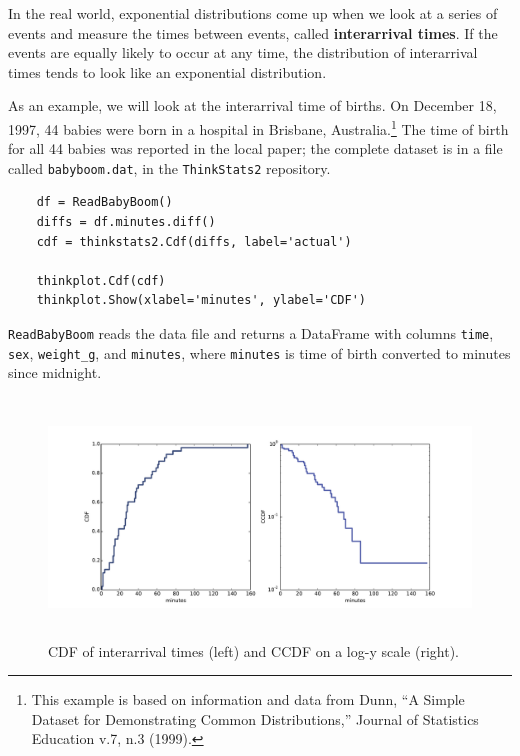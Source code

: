 \documentclass[12pt]{book}
\begin{document}
In the real world, exponential distributions
come up when we look at a series of events and measure the
times between events, called {\bf interarrival times}.
If the events are equally likely to occur at any time, the distribution
of interarrival times tends to look like an exponential distribution.

As an example, we will look at the interarrival time of births.
On December 18, 1997, 44 babies were born in a hospital in Brisbane,
Australia.\footnote{This example is based on information and data from
  Dunn, ``A Simple Dataset for Demonstrating Common Distributions,''
  Journal of Statistics Education v.7, n.3 (1999).}  The time of
birth for all 44 babies was reported in the local paper; the
complete dataset is in a file called {\tt babyboom.dat}, in the
{\tt ThinkStats2} repository.
 

\begin{verbatim}
    df = ReadBabyBoom()
    diffs = df.minutes.diff()
    cdf = thinkstats2.Cdf(diffs, label='actual')

    thinkplot.Cdf(cdf)
    thinkplot.Show(xlabel='minutes', ylabel='CDF')
\end{verbatim}

{\tt ReadBabyBoom} reads the data file and returns a DataFrame
with columns {\tt time}, {\tt sex}, \verb"weight_g", and {\tt minutes},
where {\tt minutes} is time of birth converted to minutes since
midnight.

\begin{figure}
\centerline{\includegraphics[height=2.5in]{figs/analytic_interarrivals.pdf}}
\caption{CDF of interarrival times (left) and CCDF on a log-y scale (right).}
\label{analytic_interarrival_cdf}
\end{figure}

\end{document}
